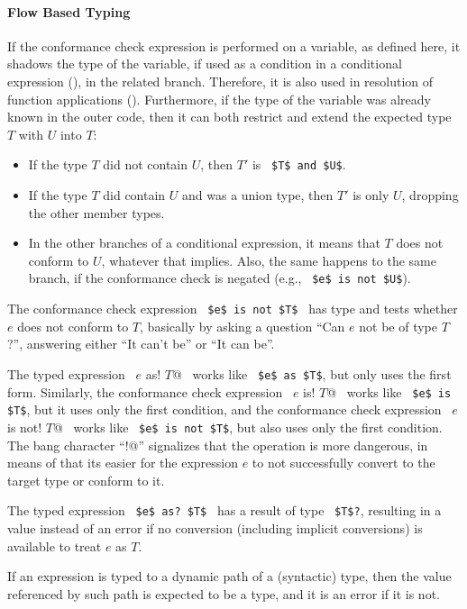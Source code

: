 \paragraph{Flow Based Typing} 
If the conformance check expression is performed on a variable, as defined here, it shadows the type of the variable, if used as a condition in a conditional expression (), in the related branch. Therefore, it is also used in resolution of function applications (). Furthermore, if the type of the variable was already known in the outer code, then it can both restrict and extend the expected type $T$ with $U$ into $T$: 
\begin{itemize}
  \item If the type $T$ did not contain $U$, then $T'$ is ~\lstinline!$T$ and $U$!.
  \item If the type $T$ did contain $U$ and was a union type, then $T'$ is only $U$, dropping the other member types. 
  \item In the other branches of a conditional expression, it means that $T$ does not conform to $U$, whatever that implies. Also, the same happens to the same branch, if the conformance check is negated (e.g., ~\lstinline!$e$ is not $U$!). 
\end{itemize}

The conformance check expression ~\lstinline!$e$ is not $T$!~ has type  and tests whether $e$ does not conform to $T$, basically by asking a question ``Can $e$ not be of type $T$?'', answering either ``It can't be'' or ``It can be''.

The typed expression ~\lstinline@$e$ as! $T$@~ works like ~\lstinline!$e$ as $T$!, but only uses the first form. Similarly, the conformance check expression ~\lstinline@$e$ is! $T$@~ works like ~\lstinline!$e$ is $T$!, but it uses only the first condition, and the conformance check expression ~\lstinline@$e$ is not! $T$@~ works like ~\lstinline!$e$ is not $T$!, but also uses only the first condition. The bang character ``\lstinline@!@'' signalizes that the operation is more dangerous, in means of that its easier for the expression $e$ to not successfully convert to the target type or conform to it. 

The typed expression ~\lstinline!$e$ as? $T$!~ has a result of type ~\lstinline!$T$?!, resulting in a  value instead of an error if no conversion (including implicit conversions) is available to treat $e$ as $T$. 

If an expression is typed to a dynamic path of a (syntactic) type, then the value referenced by such path is expected to be a type, and it is an error if it is not. 






